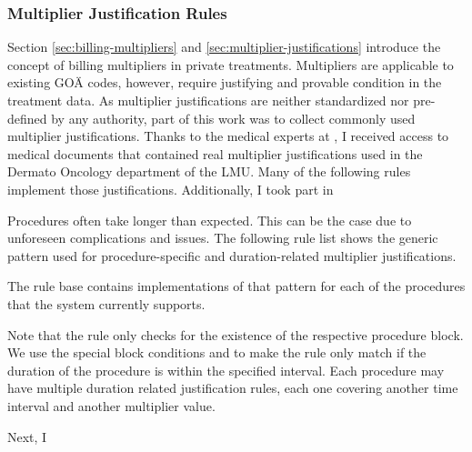 \subsubsection{Multiplier Justification Rules}\label{subsec:multiplier-justification-rules}
Section \ref{sec:billing-multipliers} and \ref{sec:multiplier-justifications} introduce the concept of billing multipliers in private treatments.
Multipliers are applicable to existing GOÄ codes, however, require justifying and provable condition in the treatment data.
As multiplier justifications are neither standardized nor pre-defined by any authority,
part of this work was to collect commonly used multiplier justifications.
Thanks to the medical experts at \AV, I received access to medical documents that contained real multiplier justifications used in the Dermato Oncology department of the LMU.
Many of the following rules implement those justifications.
Additionally, I took part in 





Procedures often take longer than expected.
This can be the case due to unforeseen complications and issues.
The following rule list shows the generic pattern used for procedure-specific and duration-related multiplier justifications.



The rule base contains implementations of that pattern for each of the procedures that the system currently supports.

Note that the rule only checks for the existence of the respective procedure block.
We use the special block conditions  and  to make the rule only match if the duration of the procedure is within the specified interval.
Each procedure may have multiple duration related justification rules, each one covering another time interval and another multiplier value.






Next, I
